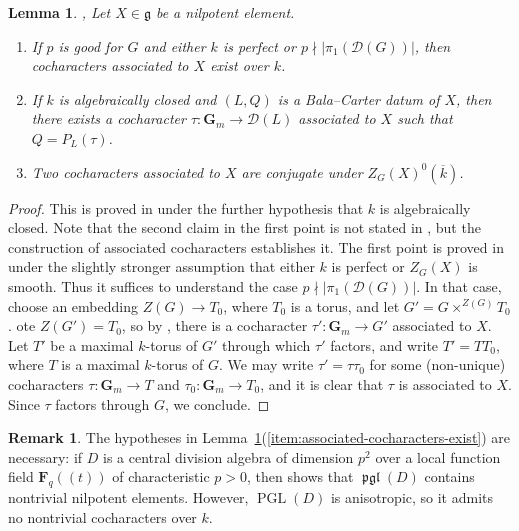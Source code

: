 \documentclass[11pt,reqno]{amsart}
\newtheorem{lemma}[theorem]{Lemma}
\theoremstyle{definition}
\newtheorem{remark}[theorem]{Remark}
\newcommand{\bF}{{\mathbf F}}
\newcommand{\bG}{{\mathbf G}}
\newcommand{\sD}{{\mathscr D}}
\newcommand{\fg}{\mathfrak{g}}
\DeclareMathOperator{\pgl}{\mathfrak{pgl}}
\DeclareMathOperator{\PGL}{PGL}
\begin{document}
\begin{lemma}\label{lemma:existence-of-associated-cocharacters}\cite[5.3]{Jantzen-nilpotent}, \cite[Thm.\ 26]{McNinch-nilpotent-orbits}
Let $X \in \fg$ be a nilpotent element.
\begin{enumerate}
    \item\label{item:associated-cocharacters-exist} If $p$ is good for $G$ and either $k$ is perfect or $p \nmid |\pi_1(\sD(G))|$, then cocharacters associated to $X$ exist over $k$. 
    \item\label{item:associated-cocharacters-bala-carter} If $k$ is algebraically closed and $(L, Q)$ is a Bala--Carter datum of $X$, then there exists a cocharacter $\tau: \bG_m \to \sD(L)$ associated to $X$ such that $Q = P_L(\tau)$.
    \item\label{item:associated-cocharacters-conjugate} Two cocharacters associated to $X$ are conjugate under $Z_G(X)^0(\overline{k})$.
\end{enumerate}
\end{lemma}

\begin{proof}
This is proved in \cite[5.3]{Jantzen-nilpotent} under the further hypothesis that $k$ is algebraically closed. Note that the second claim in the first point is not stated in \cite[5.3]{Jantzen-nilpotent}, but the construction of associated cocharacters establishes it. The first point is proved in \cite[Thm.\ 26]{McNinch-nilpotent-orbits} under the slightly stronger assumption that either $k$ is perfect or $Z_G(X)$ is smooth. Thus it suffices to understand the case $p \nmid |\pi_1(\sD(G))|$. In that case, choose an embedding $Z(G) \to T_0$, where $T_0$ is a torus, and let $G' = G \times^{Z(G)} T_0$. ote $Z(G') = T_0$, so by \cite[Thm.\ 26]{McNinch-nilpotent-orbits}, there is a cocharacter $\tau': \bG_m \to G'$ associated to $X$. Let $T'$ be a maximal $k$-torus of $G'$ through which $\tau'$ factors, and write $T' = TT_0$, where $T$ is a maximal $k$-torus of $G$. We may write $\tau' = \tau \tau_0$ for some (non-unique) cocharacters $\tau: \bG_m \to T$ and $\tau_0: \bG_m \to T_0$, and it is clear that $\tau$ is associated to $X$. Since $\tau$ factors through $G$, we conclude.
\end{proof}

\begin{remark}
The hypotheses in Lemma~\ref{lemma:existence-of-associated-cocharacters}(\ref{item:associated-cocharacters-exist}) are necessary: if $D$ is a central division algebra of dimension $p^2$ over a local function field $\bF_q(\!(t)\!)$ of characteristic $p > 0$, then \cite[Ex.\ 6.21]{Integral-Springer} shows that $\pgl(D)$ contains nontrivial nilpotent elements. However, $\PGL(D)$ is anisotropic, so it admits no nontrivial cocharacters over $k$.
\end{remark}
\end{document}
